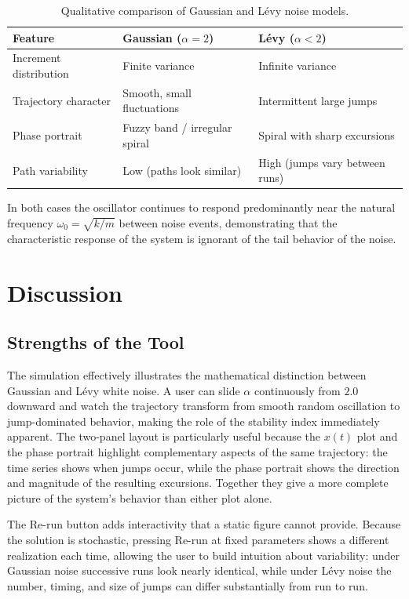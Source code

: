 \documentclass[12pt]{article}
\begin{document}
\begin{table}[H]
    \centering
    \begin{tabular}{lll}
        \hline
        \textbf{Feature} & \textbf{Gaussian ($\alpha=2$)} & \textbf{L\'{e}vy ($\alpha < 2$)} \\
        \hline
        Increment distribution & Finite variance & Infinite variance \\
        Trajectory character   & Smooth, small fluctuations & Intermittent large jumps \\
        Phase portrait         & Fuzzy band / irregular spiral & Spiral with sharp excursions \\
        Path variability & Low (paths look similar) & High (jumps vary between runs) \\
        \hline
    \end{tabular}
    \caption{Qualitative comparison of Gaussian and L\'{e}vy noise models.}
    \label{tab:comparison}
\end{table}

In both cases the oscillator continues to respond predominantly near the
natural frequency $\omega_0 = \sqrt{k/m}$ between noise events, demonstrating
that the characteristic response of the system is ignorant of the tail behavior of
the noise.

\section{Discussion}

\subsection{Strengths of the Tool}

The simulation effectively illustrates the mathematical distinction between
Gaussian and L\'{e}vy white noise.
A user can slide $\alpha$ continuously from $2.0$ downward and watch the
trajectory transform from smooth random oscillation to jump-dominated behavior,
making the role of the stability index immediately apparent.
The two-panel layout is particularly useful because the $x(t)$ plot and the
phase portrait highlight complementary aspects of the same trajectory:
the time series shows when jumps occur, while the phase portrait shows the
direction and magnitude of the resulting excursions.
Together they give a more complete picture of the system's behavior than
either plot alone.

The Re-run button adds interactivity that a static figure cannot provide.
Because the solution is stochastic, pressing Re-run at fixed parameters
shows a different realization each time, allowing the user to build intuition
about variability: under Gaussian noise successive runs look nearly identical,
while under L\'{e}vy noise the number, timing, and size of jumps can differ
substantially from run to run.
\end{document}
